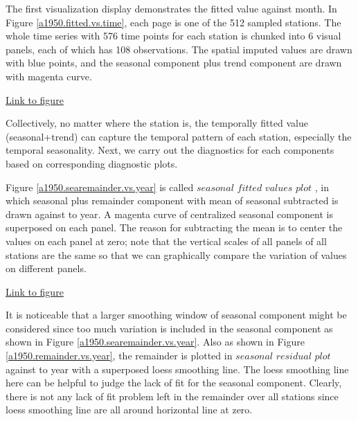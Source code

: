 The first visualization display demonstrates the fitted value against month. In 
Figure \href{../plots/a1950/stlplus/t231td2_s21sd1_ffd/a1950.stlraw.vs.time.pdf}
{\ref*{a1950.fitted.vs.time}}, each page is one of the 512 sampled stations. The 
whole time series with 576 time points for each station is chunked into 6 visual 
panels, each of which has 108 observations. The spatial imputed values are drawn 
with blue points, and the seasonal component plus trend component are drawn with
magenta curve.  

\begin{framed}
\begin{center}
  \href{../plots/a1950/stlplus/t231td2_s21sd1_ffd/a1950.stlraw.vs.time.pdf}
  {Link to figure}
  \label{a1950.fitted.vs.time}
\end{center}
\end{framed}

Collectively, no matter where the station is, the temporally fitted value 
(seasonal+trend) can capture the temporal pattern of each station, especially the
temporal seasonality. Next, we carry out the diagnostics for each components 
based on corresponding diagnostic plots.

Figure 
\href{../plots/a1950/stlplus/t231td2_s21sd1_ffd/a1950.searemainder.vs.year.pdf}
{\ref*{a1950.searemainder.vs.year}} is called $seasonal$ $fitted$ $values$ $plot$
\cite{hafen2010local}, in which seasonal plus remainder component with mean of 
seasonal subtracted is drawn against to year. A magenta curve of centralized 
seasonal component is superposed on each panel. The reason for subtracting the 
mean is to center the values on each panel at zero; note that the vertical scales 
of all panels of all stations are the same so that we can graphically compare the 
variation of values on different panels.

\begin{framed}
\begin{center}
  \href{../plots/a1950/stlplus/t231td2_s21sd1_ffd/a1950.searemainder.vs.year.pdf}
  {Link to figure}
  \label{a1950.searemainder.vs.year}
\end{center}
\end{framed}

It is noticeable that a larger smoothing window of seasonal component might be 
considered since too much variation is included in the seasonal component as
shown in Figure 
\href{../plots/a1950/stlplus/t231td2_s21sd1_ffd/a1950.searemainder.vs.year.pdf}
{\ref*{a1950.searemainder.vs.year}}. 
Also as shown in Figure
\href{../plots/a1950/stlplus/t231td2_s21sd1_ffd/a1950.remainder.vs.year.pdf}
{\ref*{a1950.remainder.vs.year}}, the remainder is plotted in $seasonal$ 
$residual$ $plot$ \cite{hafen2010local} against to year with a superposed loess 
smoothing line. The loess smoothing line here can be helpful to judge the lack
of fit for the seasonal component. Clearly, there is not any lack of fit problem
left in the remainder over all stations since loess smoothing line are all around
horizontal line at zero.

